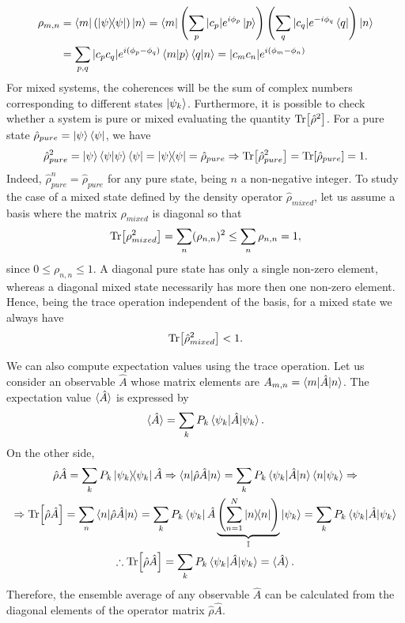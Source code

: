 \begin{align}
	\rho_{m,n} &= \bra{m}(\ketbra{\psi}{\psi})\ket{n} = \bra{m}\left(\sum_{p} |c_p|e^{i\phi_p} \ket{p}\right)\left(\sum_{q} |c_q|e^{- i \phi_{q}} \bra{q}\right)\ket{n} \\
	&= \sum_{p,q} |c_p c_q |e^{i(\phi_p - \phi_q)} \braket{m|p} \braket{q|n} = |c_m c_n| e^{i(\phi_m - \phi_n)}
\end{align}
For mixed systems, the coherences will be the sum of complex numbers corresponding to different states $ \ket{\psi_k} $. Furthermore, it is possible to check whether a system is pure or mixed evaluating the quantity $ \Tr[\hat{\rho}^2] $. For a pure state $ \hat{\rho}_{pure} = \ket{\psi}\bra{\psi} $, we have 
\begin{equation}
	\hat{\rho}_{pure}^2 = \ket{\psi}\braket{\psi|\psi}\bra{\psi} = \ketbra{\psi}{\psi} = \hat{\rho}_{pure} \Rightarrow \Tr[\hat{\rho}_{pure}^2] = \Tr[\hat{\rho}_{pure}] = 1.
\end{equation}
Indeed, $ \hat{\rho}_{pure}^n = \hat{\rho}_{pure} $ for any pure state, being $ n $ a non-negative integer. To study the case of a mixed state defined by the density operator $ \hat{\rho}_{mixed} $, let us assume a basis where the matrix $ \rho_{mixed} $ is diagonal so that
\begin{equation}
	\Tr[\rho_{mixed}^2] = \sum_n (\rho_{n,n})^2 \leq \sum_n \rho_{n,n} = 1,
\end{equation}
since $ 0 \leq \rho_{n,n} \leq 1 $. A diagonal pure state has only a single non-zero element, whereas a diagonal mixed state necessarily has more then one non-zero element. Hence, being the trace operation independent of the basis, for a mixed state we always have
\begin{equation}
	\Tr[\hat{\rho}_{mixed}^2] < 1.
\end{equation}

We can also compute expectation values using the trace operation. Let us consider an observable $ \hat{A} $ whose matrix elements are $ A_{m,n} = \braket{m|\hat{A}|n} $. The expectation value $ \braket{\hat{A}} $ is expressed by
\begin{equation}
	\braket{\hat{A}} = \sum_{k} P_k \braket{\psi_k|\hat{A}|\psi_k}.
\end{equation}
On the other side,
\begin{gather}
	\hat{\rho}\hat{A} = \sum_{k} P_k \ketbra{\psi_k}{\psi_k}\hat{A} \Rightarrow \braket{n|\hat{\rho}\hat{A}|n} = \sum_{k} P_k \braket{\psi_k|\hat{A}|n} \braket{n|\psi_k} \Rightarrow \\
	\Rightarrow \Tr[\hat{\rho}\hat{A}] = \sum_{n} \braket{n|\hat{\rho}\hat{A}|n} = \sum_{k} P_k \bra{\psi_k} \hat{A} \underbrace{\left( \sum_{n = 1}^{N} \ketbra{n}{n} \right)}_{\mathbb{I}} \ket{\psi_k} = \sum_{k} P_k \braket{\psi_k|\hat{A}|\psi_k} \\
	\therefore \Tr[\hat{\rho}\hat{A}] = \sum_{k} P_k \braket{\psi_k|\hat{A}|\psi_k} = \braket{\hat{A}}.
	\label{eq:trace-average}
\end{gather}
Therefore, the ensemble average of any observable $ \hat{A} $ can be calculated from the diagonal elements of the operator matrix $ \hat{\rho}\hat{A} $.

